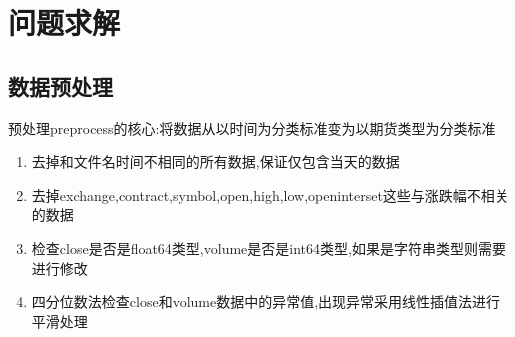 \documentclass[a4paper,11pt]{ctexart}
\begin{document}


\section{问题求解}




\subsection{数据预处理}
预处理preprocess的核心:将数据从以时间为分类标准变为以期货类型为分类标准
\begin{enumerate}
\item 去掉和文件名时间不相同的所有数据,保证仅包含当天的数据
\item 去掉exchange,contract,symbol,open,high,low,openinterset这些与涨跌幅不相关的数据
\item 检查close是否是float64类型,volume是否是int64类型,如果是字符串类型则需要进行修改
\item 四分位数法检查close和volume数据中的异常值,出现异常采用线性插值法进行平滑处理
\end{enumerate}
\end{document}
